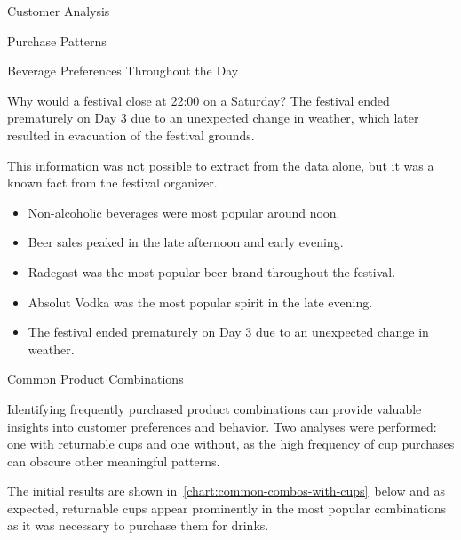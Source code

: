 \begin{section}{Customer Analysis}
\begin{subsection}{Purchase Patterns}
\begin{subsubsection}{Beverage Preferences Throughout the Day}
			\begin{infobox}{Why would a festival close at 22:00 on a Saturday?}
				The festival ended prematurely on Day 3 due to an unexpected change in weather, which later resulted in evacuation of the festival grounds.
			\end{infobox}

			This information was not possible to extract from the data alone, but it was a known fact from the festival organizer.

			\begin{keytakeaways}
				\begin{itemize}
					\item Non-alcoholic beverages were most popular around noon.
					\item Beer sales peaked in the late afternoon and early evening.
					\item Radegast was the most popular beer brand throughout the festival.
					\item Absolut Vodka was the most popular spirit in the late evening.
					\item The festival ended prematurely on Day 3 due to an unexpected change in weather.
				\end{itemize}
			\end{keytakeaways}
		\end{subsubsection}

		\begin{subsubsection}{Common Product Combinations}
			\label{subsubsec:analysis-common-combinations}


			Identifying frequently purchased product combinations can provide valuable insights into customer preferences and behavior.
			Two analyses were performed: one with returnable cups and one without, as the high frequency of cup purchases can obscure other meaningful patterns.

			The initial results are shown in~\autoref{chart:common-combos-with-cups}~below and as expected, returnable cups appear prominently in the most popular combinations as it was necessary to purchase them for drinks.


\end{subsubsection}
\end{subsection}
\end{section}
